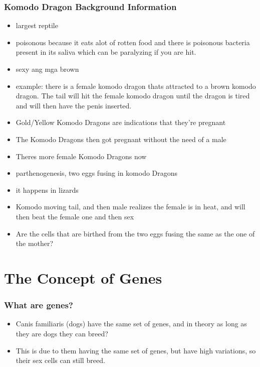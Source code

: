 \documentclass{article}
\begin{document}
\subsubsection*{Komodo Dragon Background Information}
\begin{itemize}
    \item largest reptile
    \item poisonous because it eats alot of rotten food and there is poisonous bacteria present in its saliva which can be paralyzing if you are hit.
    \item sexy ang mga brown
    \item example: there is a female komodo dragon thats attracted to a brown komodo dragon. The tail will hit the female komodo dragon until the dragon is tired and will then have the penis inserted.
    \item Gold/Yellow Komodo Dragons are indications that they're pregnant
    \item The Komodo Dragons then got pregnant without the need of a male
    \item Theres more female Komodo Dragons now
    \item parthenogenesis, two eggs fusing in komodo Dragons
    \item it happens in lizards
    \item Komodo moving tail, and then male realizes the female is in heat, and will then beat the female one and then sex
    \item Are the cells that are birthed from the two eggs fusing the same as the one of the mother?
\end{itemize}

\section*{The Concept of Genes}
\subsubsection*{What are genes?}
\begin{itemize}
    \item Canis familiaris (dogs) have the same set of genes, and in theory as long as they are dogs they can breed?
    \item This is due to them having the same set of genes, but have high variations, so their sex cells can still breed.
\end{itemize}
\end{document}
